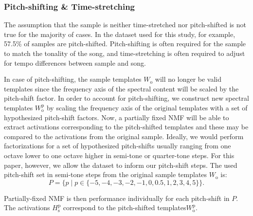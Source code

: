 \documentclass{article}
\begin{document}
\subsubsection{Pitch-shifting \& Time-stretching}
The assumption that the sample is neither time-stretched nor pitch-shifted is not true for the majority of cases. In the dataset used for this study, for example, 57.5\% of samples are pitch-shifted. Pitch-shifting is often required for the sample to match the tonality of the song, and time-stretching is often required to adjust for tempo differences between sample and song.


In case of pitch-shifting, the sample templates $W_{\mathrm{o}}$ will no longer be valid templates since the frequency axis of the spectral content will be scaled by the pitch-shift factor. In order to account for pitch-shifting, we construct new spectral templates $W_{\mathrm{o}}^{\mathrm{p}}$ by scaling the frequency axis of the original templates with a set of hypothesized pitch-shift factors. Now, a partially fixed NMF will be able to extract activations corresponding to the pitch-shifted templates and these may be compared to the activations from the original sample. Ideally, we would perform factorizations for a set of hypothesized pitch-shifts usually ranging from one octave lower to one octave higher in semi-tone or quarter-tone steps. For this paper, however, we allow the dataset to inform our pitch-shift steps. The used pitch-shift set in semi-tone steps from the original sample templates $W_\mathrm{o}$ is: 
\[ P = \{p \mid p \in \{-5,-4,-3,-2,-1,0,0.5,1,2,3,4,5\}\}.\]

Partially-fixed NMF is then performance individually for each pitch-shift in $P$. The activations $H_{\mathrm{s}}^{\mathrm{p}}$ correspond to the pitch-shifted templates$W_{\mathrm{o}}^{\mathrm{p}}$.
\end{document}
